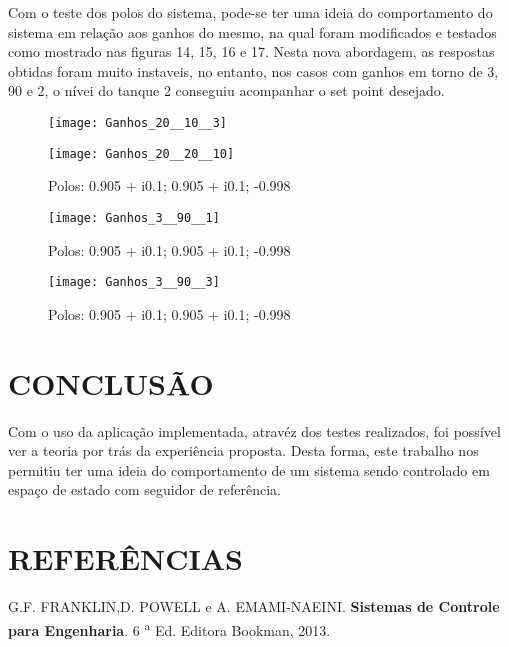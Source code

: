 \documentclass[a4paper,12pt]{article}
\begin{document}
\hspace{4ex}Com o teste dos polos do sistema, pode-se ter uma ideia do comportamento do sistema em relação aos ganhos do mesmo, na qual foram modificados e testados como mostrado nas figuras 14, 15, 16 e 17. Nesta nova abordagem, as respostas obtidas foram muito instaveis, no entanto, nos casos com ganhos em torno de 3, 90 e 2, o nívei do tanque 2 conseguiu acompanhar o set point desejado. 

\begin{figure}[h!]
\texttt{[image: Ganhos\_20\_\_10\_\_3]}
\caption{}
\end{figure}

\begin{figure}[h!]
\texttt{[image: Ganhos\_20\_\_20\_\_10]}
\caption{Polos: 0.905 + i0.1; 0.905 + i0.1; -0.998}
\end{figure}

\newpage

\thispagestyle{main}

\begin{figure}[h!]
\texttt{[image: Ganhos\_3\_\_90\_\_1]}
\caption{Polos: 0.905 + i0.1; 0.905 + i0.1; -0.998}
\end{figure}

\begin{figure}[h!]
\texttt{[image: Ganhos\_3\_\_90\_\_3]}
\caption{Polos: 0.905 + i0.1; 0.905 + i0.1; -0.998}
\end{figure}

\newpage


\thispagestyle{main}

\section{CONCLUSÃO}


\hspace{4ex} Com o uso da aplicação implementada, atravéz dos testes realizados, foi possível ver a teoria por trás da experiência proposta. Desta forma, este trabalho nos permitiu ter uma ideia do comportamento de um sistema sendo controlado em espaço de estado com seguidor de referência.

\newpage


\thispagestyle{main}

\section{REFER\^{E}NCIAS}

G.F. FRANKLIN,D. POWELL e A. EMAMI-NAEINI. \textbf{Sistemas de Controle para Engenharia}. 6 \textsuperscript{a} Ed. Editora Bookman, 2013.
\appendix


\end{document}
